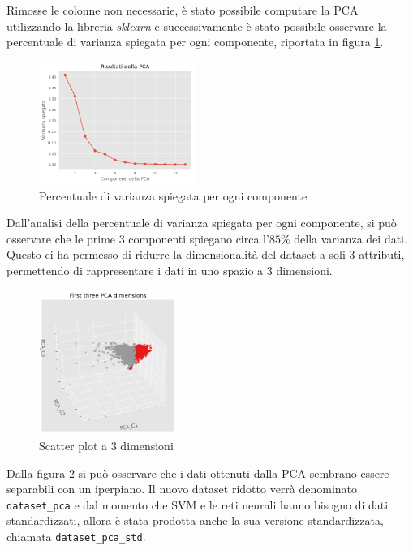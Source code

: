Rimosse le colonne non necessarie, è stato possibile computare la PCA utilizzando
la libreria \textit{sklearn} e successivamente è stato possibile osservare la
percentuale di varianza spiegata per ogni componente, riportata in figura \ref{fig:pca}.
\begin{figure}[!ht]
      \centering
      \includegraphics[width=0.45\textwidth]{img/analisi/pcaVarianza.png}
      \caption{Percentuale di varianza spiegata per ogni componente}
      \label{fig:pca}
\end{figure}

Dall'analisi della percentuale di varianza spiegata per ogni componente, si può
osservare che le prime $3$ componenti spiegano circa l'$85\%$ della varianza
dei dati. Questo ci ha permesso di ridurre la dimensionalità del dataset a soli
$3$ attributi, permettendo di rappresentare i dati in uno spazio a $3$ dimensioni.
\begin{figure}[!ht]
      \centering
      \includegraphics[width=0.4\textwidth]{img/analisi/pcaNuovoDataset.png}
      \caption{Scatter plot a 3 dimensioni}
      \label{fig:pca-3d}
\end{figure}

Dalla figura \ref{fig:pca-3d} si può osservare che i dati ottenuti dalla PCA
sembrano essere separabili con un iperpiano. Il nuovo dataset ridotto verrà
denominato \texttt{dataset\_pca} e dal momento che SVM e le reti neurali hanno bisogno di dati
standardizzati, allora è stata prodotta anche la sua versione standardizzata,
chiamata \texttt{dataset\_pca\_std}.